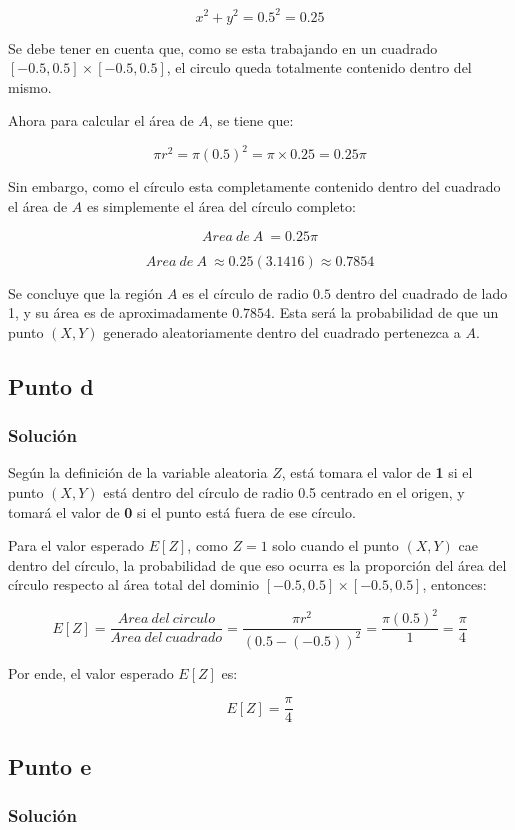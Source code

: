 \documentclass[12pt]{article}
\begin{document}
\[x^2+y^2=0.5^2=0.25\]

Se debe tener en cuenta que, como se esta trabajando en un cuadrado $[-0.5,0.5] \times [-0.5,0.5]$, el circulo queda totalmente contenido dentro del mismo.


Ahora para calcular el área de $A$, se tiene que:

\[\pi r^2=\pi(0.5)^2=\pi\times0.25=0.25\pi\]

Sin embargo, como el círculo esta completamente contenido dentro del cuadrado el área de $A$ es simplemente el área del círculo completo:

\[Area\ de\ A\ =0.25\pi\]

\[Area\ de\ A\ \approx0.25(3.1416)\approx0.7854\]

Se concluye que la región $A$ es el círculo de radio $0.5$ dentro del cuadrado de lado 1, y su área es de aproximadamente $0.7854$. Esta será la probabilidad de que un punto \textit{$(X,Y)$} generado aleatoriamente dentro del cuadrado pertenezca a $A$.


\subsection{Punto d}
\subsubsection{Solución}

Según la definición de la variable aleatoria $Z$, está tomara el valor de \textbf{1} si el punto $(X,Y)$ está dentro del círculo de radio 0.5 centrado en el origen, y tomará el valor de \textbf{0} si el punto está fuera de ese círculo. 


Para el valor esperado $E[Z]$, como $Z=1$ solo cuando el punto $(X,Y)$ cae dentro del círculo, la probabilidad de que eso ocurra es la proporción del área del círculo respecto al área total del dominio $[-0.5,0.5]\times[-0.5,0.5]$, entonces:

\[E[Z] = \frac{Area\ del\ circulo}{Area\ del\ cuadrado} = \frac{\pi r^2}{(0.5-(-0.5))^2}=\frac{\pi(0.5)^2}{1}=\frac{\pi}{4}\]


Por ende, el valor esperado $E[Z]$ es:

\[E[Z]=\frac{\pi}{4}\]



\subsection{Punto e}
\subsubsection{Solución}
\end{document}
